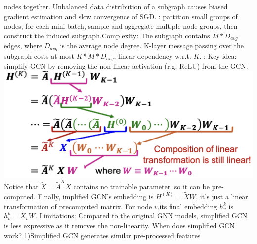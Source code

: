 nodes together. Unbalanced data distribution of a subgraph causes biased gradient estimation and slow convergence of SGD. : partition small groups of nodes, for each mini-batch, sample and aggregate multiple node groups, then construct the induced subgraph.\underline{Complexity}: The subgraph contains $M*D_{avg}$ edges, where $D_{avg}$ is the average node degree. K-layer message passing over the subgraph costs at most $K*M*D_{avg}$, linear dependency w.r.t. $K$. : Key-idea: simplify GCN by removing the non-linear activation (r.g. ReLU) from the GCN. \includegraphics[height=0.06\textwidth]{figs/l9-1.png}  Notice that $\widetilde{X} = \widetilde{A}^KX$ contains no trainable parameter, so it can be pre-computed. Finally, implified GCN’s embedding is $H^{(K)} = \widetilde{X}W$, it’s just a linear transformation of precomputed matrix. For node $v$,its final embedding $h^k_v$ is $h^k_v=\widetilde{X}_vW$. \underline{Limitations}: Compared to the original GNN models, simplified GCN is less expressive as it removes the non-linearity. When does simplified GCN work? 1)Simplified GCN generates similar pre-processed features
